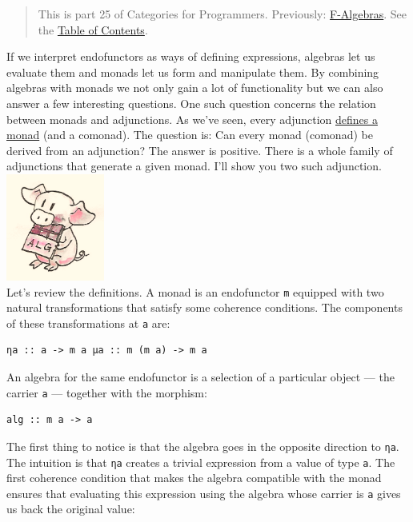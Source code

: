 \begin{quote}
This is part 25 of Categories for Programmers. Previously:
\href{https://bartoszmilewski.com/2017/02/28/f-algebras/}{F-Algebras}.
See the
\href{https://bartoszmilewski.com/2014/10/28/category-theory-for-programmers-the-preface/}{Table
of Contents}.
\end{quote}

If we interpret endofunctors as ways of defining expressions, algebras
let us evaluate them and monads let us form and manipulate them. By
combining algebras with monads we not only gain a lot of functionality
but we can also answer a few interesting questions. One such question
concerns the relation between monads and adjunctions. As we've seen,
every adjunction
\href{https://bartoszmilewski.com/2016/12/27/monads-categorically/}{defines
a monad} (and a comonad). The question is: Can every monad (comonad) be
derived from an adjunction? The answer is positive. There is a whole
family of adjunctions that generate a given monad. I'll show you two
such adjunction.\\
\includegraphics[width=1.27083in]{images/pigalg.png}\\
Let's review the definitions. A monad is an endofunctor \texttt{m}
equipped with two natural transformations that satisfy some coherence
conditions. The components of these transformations at \texttt{a} are:

\begin{verbatim}
ηa :: a -> m a μa :: m (m a) -> m a
\end{verbatim}

An algebra for the same endofunctor is a selection of a particular
object --- the carrier \texttt{a} --- together with the morphism:

\begin{verbatim}
alg :: m a -> a
\end{verbatim}

The first thing to notice is that the algebra goes in the opposite
direction to \texttt{ηa}. The intuition is that \texttt{ηa} creates a
trivial expression from a value of type \texttt{a}. The first coherence
condition that makes the algebra compatible with the monad ensures that
evaluating this expression using the algebra whose carrier is \texttt{a}
gives us back the original value:

